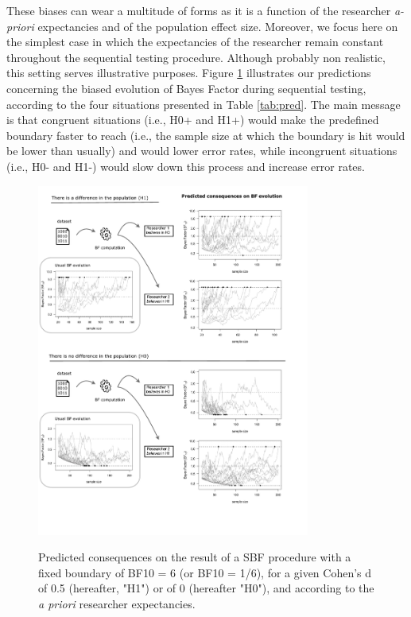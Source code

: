\documentclass[a4paper,man,natbib,floatsintext,donotrepeattitle]{apa6}
\begin{document}
These biases can wear a multitude of forms as it is a function of the researcher \textit{a-priori} expectancies and of the population effect size. Moreover, we focus here on the simplest case in which the expectancies of the researcher remain constant throughout the sequential testing procedure. Although probably non realistic, this setting serves illustrative purposes. Figure \ref{fig:pred} illustrates our predictions concerning the biased evolution of Bayes Factor during sequential testing, according to the four situations presented in Table \ref{tab:pred}. The main message is that congruent situations (i.e., H0+ and H1+) would make the predefined boundary faster to reach (i.e., the sample size at which the boundary is hit would be lower than usually) and would lower error rates, while incongruent situations (i.e., H0- and H1-) would slow down this process and increase error rates.

\begin{figure}[H]
  \caption{Predicted consequences on the result of a SBF procedure with a fixed boundary of BF10 = 6 (or BF10 = 1/6), for a given Cohen's d of 0.5 (hereafter, "H1") or of 0 (hereafter "H0"), and according to the \emph{a priori} researcher expectancies.}
  \centering
  \includegraphics[width=0.8\textwidth]{figures/BFF_predictions.pdf}
  \label{fig:pred}
\end{figure}
\end{document}

